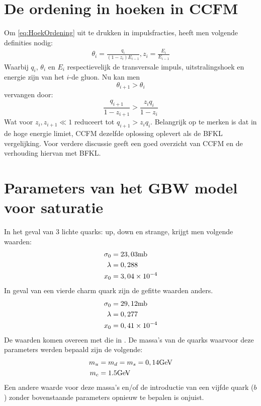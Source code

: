 \documentclass[a4paper,11pt]{article}
\numberwithin{equation}{section} %
\begin{document}
\section{De ordening in hoeken in CCFM} \label{app:CCFM}
Om \eqref{eq:HoekOrdening} uit te drukken in impulsfracties, heeft men volgende definities nodig:
\begin{align}
\theta_i = \frac{q_i}{(1-z_i)E_{i-1}}, z_i = \frac{E_i}{E_{i-1}}
\end{align}
Waarbij $q_i$, $\theta_i$ en $E_i$ respectievelijk de transversale impuls, uitstralingshoek en energie zijn van het $i$-de gluon.
Nu kan men
\begin{equation}
\theta_{i+1} > \theta_i
\end{equation}
 vervangen door:
\begin{equation}
 \frac{q_{i+1}}{1-z_{i+1}} > \frac{z_i q_i}{1-z_i}
\end{equation}
Wat voor $z_i, z_{i+1} \ll 1$ reduceert tot $q_{i+1} > z_i q_i$.
Belangrijk op te merken is dat in de hoge energie limiet, CCFM dezelfde oplossing oplevert als de BFKL vergelijking.
Voor verdere discussie geeft \cite{Vera} een goed overzicht van CCFM en de verhouding hiervan met BFKL.

\section{Parameters van het GBW model voor saturatie} \label{app:GBWParameters}
In het geval van 3 lichte quarks: up, down en strange, krijgt men volgende waarden:
\begin{align}
\sigma_0 &= 23,03 \text{mb} \notag \\
\lambda &= 0,288 \\
x_0 &= 3,04 \times 10^{-4} \notag
\end{align}
In geval van een vierde charm quark zijn de gefitte waarden anders.
\begin{align}
\sigma_0 &= 29,12 \text{mb} \notag \\
\lambda &= 0,277 \\
x_0 &= 0,41 \times 10^{-4} \notag
\end{align}
De waarden komen overeen met die in \cite{GBW}.
De massa’s van de quarks waarvoor deze parameters werden bepaald zijn de volgende:
\begin{align}
m_u &= m_d = m_s = 0,14 \text{GeV}\notag \\
m_c &= 1.5 \text{GeV}
\end{align}
Een andere waarde voor deze massa’s en/of de introductie van een vijfde quark ($b$) zonder bovenstaande parameters opnieuw te bepalen is onjuist.
\end{document}

